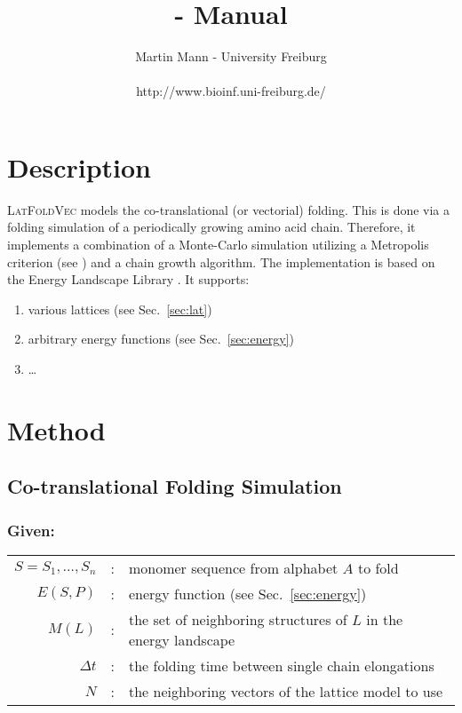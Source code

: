 \documentclass{article}
\title{\latFoldVec{} - Manual}
\date{}
\author{Martin Mann - University Freiburg \\\\
{http://www.bioinf.uni-freiburg.de/}}
\newcommand{\latFoldVec}{\textsc{LatFoldVec}}
\begin{document}
\maketitle



\section{Description}

\latFoldVec{} models the co-translational (or vectorial) folding. This is done
via a folding simulation of a periodically growing amino acid chain. Therefore,
it implements a combination of a Monte-Carlo simulation utilizing a Metropolis
criterion (see \cite{Mann:latpack:HFSP08}) and a chain growth algorithm. The
implementation is based on the Energy Landscape Library \cite{Mann:ELL:BIRD07}.
It supports:

\begin{enumerate}
  \item various lattices (see Sec.~\ref{sec:lat})
  \item arbitrary energy functions (see Sec.~\ref{sec:energy})
  \item \ldots
\end{enumerate}

\section{Method}
\label{sec:method}


\subsection{Co-translational Folding Simulation}
\label{sec:MC}

\subsubsection*{Given:}

\begin{tabular}{rcl}
	$S=S_1,\ldots,S_n$ &:& monomer sequence from alphabet $A$ to fold \\
	$E(S,P)$ &:& energy function (see Sec.~\ref{sec:energy})\\
	$M(L)$ &:& the set of neighboring structures of $L$ in the energy landscape \\
	$\Delta t$	&:& the folding time between single chain elongations \\
	$N$ &:& the neighboring vectors of the lattice model to use \\
\end{tabular}
\end{document}
